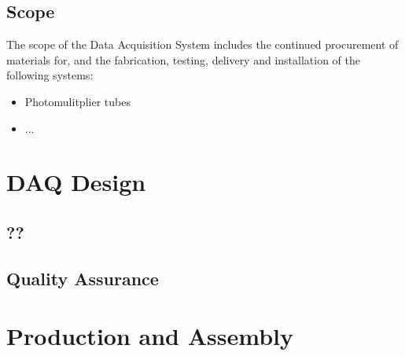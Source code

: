 \subsection{Scope}
\label{sec:fddp-daq-scope}

The scope of the Data Acquisition System includes the continued procurement of materials for, and the fabrication, testing, delivery and installation of the following systems: 


\begin{itemize}
\item Photomulitplier tubes 
\item  ...
\end{itemize}



\section{DAQ Design}
\label{sec:fddp-daq-design}




\subsection{??}
\label{sec:fddp-daq-??}

\subsection{Quality Assurance}
\label{sec:fddp-daq-qa}




\section{Production and Assembly}
\label{sec:fddp-daq-prod-assy}

\subsection{}
\label{sec:fddp-daq-?}

